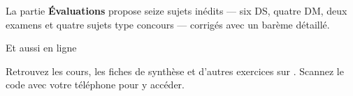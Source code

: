 \vspace{4.5mm}
{\fontsize{10}{13.5}\selectfont
La partie \textbf{Évaluations} propose seize sujets inédits — six DS, quatre
DM, deux examens et quatre sujets type concours — corrigés avec un barème
détaillé.\par}

\vspace{4.5mm}
\begin{tcolorbox}[colback=otNavyTint,colframe=otNavyTint,boxrule=0pt,arc=2mm,
  left=5mm,right=5mm,top=3mm,bottom=3mm]
\begin{minipage}[c]{24mm}
{\color{otNavy}\qrcode[height=18mm,nolink]{\otURL}}
\end{minipage}\hspace{5mm}%
\begin{minipage}[c]{120mm}
{\otSemi\fontsize{11}{14}\selectfont\color{otNavy}Et aussi en ligne}\par\vspace{1.5mm}
{\fontsize{10}{13.5}\selectfont Retrouvez les cours, les fiches de synthèse et d'autres
exercices sur \textbf{\otSite}. Scannez le code avec votre téléphone pour y accéder.}
\end{minipage}
\end{tcolorbox}
\clearpage
